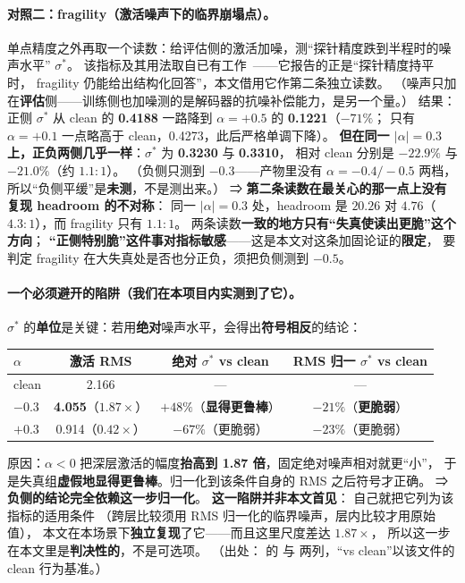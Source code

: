 \documentclass[11pt,a4paper]{ctexart}
\begin{document}
\paragraph{对照二：fragility（激活噪声下的临界崩塌点）。}
单点精度之外再取一个读数：给评估侧的激活加噪，测“探针精度跌到半程时的噪声水平” $\sigma^*$。
该指标及其用法取自已有工作~\cite{fragility}——它报告的正是“探针精度持平时，
fragility 仍能给出结构化回答”，本文借用它作第二条独立读数。
（噪声只加在\textbf{评估}侧——训练侧也加噪测的是解码器的抗噪补偿能力，是另一个量。）
结果：正侧 $\sigma^*$ 从 clean 的 \textbf{0.4188} 一路降到 $\alpha=+0.5$ 的 \textbf{0.1221}（$-71\%$；
只有 $\alpha=+0.1$ 一点略高于 clean，0.4273，此后严格单调下降）。
\textbf{但在同一 $|\alpha|=0.3$ 上，正负两侧几乎一样}：$\sigma^*$ 为 \textbf{0.3230} 与 \textbf{0.3310}，
相对 clean 分别是 $\mathbf{-22.9\%}$ 与 $\mathbf{-21.0\%}$（约 $1.1:1$）。
（负侧只测到 $-0.3$——产物里没有 $\alpha=-0.4/-0.5$ 两档，
所以“负侧平缓”是\textbf{未测}，不是测出来。）
⇒ \textbf{第二条读数在最关心的那一点上没有复现 headroom 的不对称}：
同一 $|\alpha|=0.3$ 处，headroom 是 $20.26$ 对 $4.76$（$4.3:1$），而 fragility 只有 $1.1:1$。
两条读数\textbf{一致的地方只有“失真使读出更脆”这个方向}；
\textbf{“正侧特别脆”这件事对指标敏感}——这是本文对这条加固论证的\textbf{限定}，
要判定 fragility 在大失真处是否也分正负，须把负侧测到 $-0.5$。

\paragraph{一个必须避开的陷阱（我们在本项目内实测到了它）。}
$\sigma^*$ 的\textbf{单位}是关键：若用\textbf{绝对}噪声水平，会得出\textbf{符号相反}的结论：

\begin{center}
\small
\begin{tabular}{lccc}
\toprule
$\alpha$ & 激活 RMS & 绝对 $\sigma^*$ vs clean & \textbf{RMS 归一} $\sigma^*$ vs clean \\
\midrule
clean & 2.166 & --- & --- \\
$-0.3$ & \textbf{4.055}（$1.87\times$） & $+48\%$（\textbf{显得更鲁棒}） & $-21\%$（\textbf{更脆弱}） \\
$+0.3$ & 0.914（$0.42\times$） & $-67\%$（更脆弱） & $-23\%$（更脆弱） \\
\bottomrule
\end{tabular}
\end{center}

\noindent 原因：$\alpha<0$ 把深层激活的幅度\textbf{抬高到 1.87 倍}，固定绝对噪声相对就更“小”，
于是失真组\textbf{虚假地显得更鲁棒}。归一化到该条件自身的 RMS 之后符号才正确。
⇒ \textbf{负侧的结论完全依赖这一步归一化}。
\textbf{这一陷阱并非本文首见}：\cite{fragility} 自己就把它列为该指标的适用条件
（跨层比较须用 RMS 归一化的临界噪声，层内比较才用原始值），
本文在本场景下\textbf{独立复现}了它——而且这里尺度差达 $1.87\times$，
所以这一步在本文里是\textbf{判决性的}，不是可选项。
（出处： 的 
与  两列，“vs clean”以该文件的 clean 行为基准。）
\end{document}
